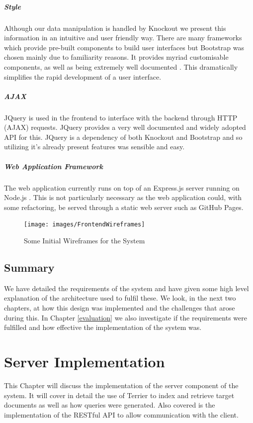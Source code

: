 \documentclass{l4proj}
\begin{document}
\paragraph{Style}
Although our data manipulation is handled by Knockout we present this information in an intuitive and user friendly way. There are many frameworks which provide pre-built components to build user interfaces but Bootstrap was chosen mainly due to familiarity reasons. It provides myriad customisable components, as well as being extremely well documented \cite{bootstrap}. This dramatically simplifies the rapid development of a user interface.

\paragraph{AJAX}
JQuery is used in the frontend to interface with the backend through HTTP (AJAX) requests. JQuery provides a very well documented and widely adopted API for this. JQuery is a dependency of both Knockout and Bootstrap and so utilizing it's already present features was sensible and easy.

\paragraph{Web Application Framework}
The web application currently runs on top of an Express.js server running on Node.js \cite{express} \cite{node}. This is not particularly necessary as the web application could, with some refactoring, be served through a static web server such as GitHub Pages.
\begin{figure}[H]
\centering
\texttt{[image: images/FrontendWireframes]}
\caption{Some Initial Wireframes for the System}
\label{wireframes}
\end{figure}

\section{Summary}
We have detailed the requirements of the system and have given some high level explanation of the architecture used to fulfil these. We look, in the next two chapters, at how this design was implemented and the challenges that arose during this. In Chapter \ref{evaluation} we also investigate if the requirements were fulfilled and how effective the implementation of the system was.

\chapter{Server Implementation} \label{serverimplementation}
This Chapter will discuss the implementation of the server component of the system. It will cover in detail the use of Terrier to index and retrieve target documents as well as how queries were generated. Also covered is the implementation of the RESTful API to allow communication with the client.
\end{document}

